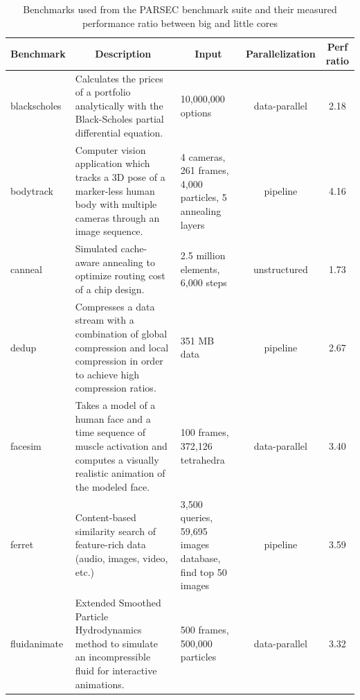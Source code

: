 \begin{table}[!t]
	\centering
	\scriptsize
	\caption{Benchmarks used from the PARSEC benchmark suite and their 
measured performance ratio between big and little cores}
    \vspace{-0.2cm}
	\setlength{\tabcolsep}{3pt}
	\begin{tabular}{|p{1.2cm}|p{9.7cm}|p{3.7cm}|c|c|}
	\hline
	\textbf{Benchmark} & \multicolumn{1}{|c|}{\textbf{Description}} & \multicolumn{1}{|c|}{\textbf{Input}} & \textbf{Parallelization} & \multicolumn{1}{|c|}{\textbf{Perf ratio}} \\
	\hline \hline
	blackscholes & Calculates the prices of a portfolio analytically with the Black-Scholes partial differential equation. & 10,000,000 options & data-parallel &2.18 \\ \hline
	bodytrack & Computer vision application which tracks a 3D pose of a marker-less human body with multiple cameras through an image sequence. & 4 cameras, 261 frames, 4,000 particles, 5 annealing layers & pipeline & 4.16 \\ \hline
	canneal & Simulated cache-aware annealing to optimize routing cost of a chip design. & 2.5 million elements, 6,000 steps & unstructured & 1.73 \\ \hline
	dedup & Compresses a data stream with a combination of global compression and local compression in order to achieve high compression ratios. & 351 MB data & pipeline & 2.67 \\ \hline
	facesim & Takes a model of a human face and a time sequence of muscle activation and computes a visually realistic animation of the modeled face. & 100 frames, 372,126 tetrahedra & data-parallel & 3.40 \\ \hline
	ferret & Content-based similarity search of feature-rich data (audio, images, video, etc.) & 3,500 queries, 59,695 images database, find top 50 images & pipeline & 3.59 \\ \hline
	fluidanimate & Extended Smoothed Particle Hydrodynamics method to simulate an 
incompressible fluid for interactive animations. & 500 frames, 500,000 particles & 
data-parallel & 3.32 \\ \hline

\end{tabular}
\end{table}
